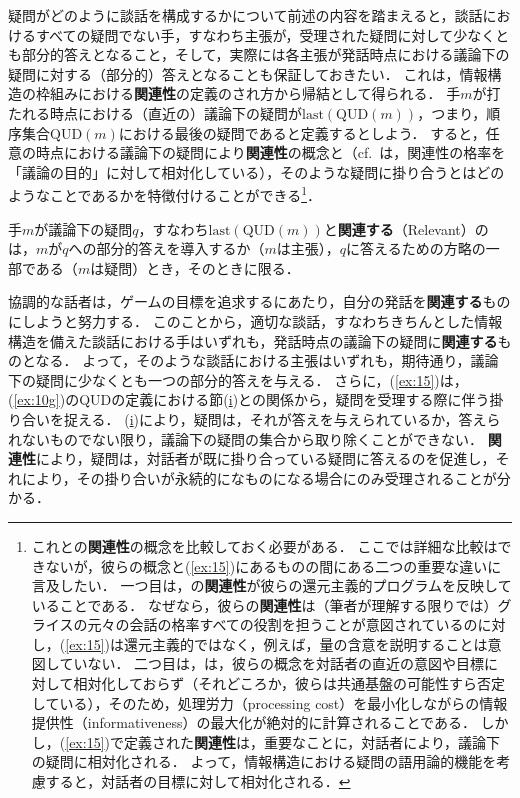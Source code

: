 \documentclass{goken}
\newcommand{\ori}[1]{\noindent\textcolor[gray]{0.7}{\fontsize{8pt}{8pt}\selectfont{\textsf{(p.~#1)}}} }
\begin{document}
疑問がどのように談話を構成するかについて前述の内容を踏まえると，談話におけるすべての疑問でない手，すなわち主張が，受理された疑問に対して少なくとも部分的答えとなること，そして，実際には各主張が発話時点における議論下の疑問に対する（部分的）答えとなることも保証しておきたい．
これは，情報構造の枠組みにおける\textbf{関連性}の定義のされ方から帰結として得られる．
手$m$が打たれる時点における（直近の）\textsf{議論下の疑問}が$\text{last}(\text{QUD}(m))$，つまり，順序集合$\text{QUD}(m)$における最後の疑問であると定義するとしよう．
\ori{21}
すると，任意の時点における議論下の疑問により\textbf{関連性}の概念と（cf.~\citeauthor{Grice1989}は，関連性の格率を「議論の目的」に対して相対化している），そのような疑問に掛り合うとはどのようなことであるかを特徴付けることができる\footnote{%
	これと\citet{SperberWilson1986}の\textbf{関連性}の概念を比較しておく必要がある．
	ここでは詳細な比較はできないが，彼らの概念と(\ref{ex:15})にあるものの間にある二つの重要な違いに言及したい．
	一つ目は，\citeauthor{SperberWilson1986}の\textbf{関連性}が彼らの還元主義的プログラムを反映していることである．
	なぜなら，彼らの\textbf{関連性}は（筆者が理解する限りでは）グライスの元々の会話の格率すべての役割を担うことが意図されているのに対し，(\ref{ex:15})は還元主義的ではなく，例えば，量の含意を説明することは意図していない．
	二つ目は，\citeauthor{SperberWilson1986}は，彼らの概念を対話者の直近の意図や目標に対して相対化しておらず（それどころか，彼らは共通基盤の可能性すら否定している），そのため，処理労力（processing cost）を最小化しながらの情報提供性（informativeness）の最大化が絶対的に計算されることである．
	しかし，(\ref{ex:15})で定義された\textbf{関連性}は，重要なことに，対話者により，議論下の疑問に相対化される．
	よって，情報構造における疑問の語用論的機能を考慮すると，対話者の目標に対して相対化される．
}．

\begin{exe}
	\ex\label{ex:15} 手$m$が議論下の疑問$q$，すなわち$\text{last}(\text{QUD}(m))$と\textbf{関連する}（Relevant）のは，$m$が$q$への部分的答えを導入するか（$m$は主張），$q$に答えるための方略の一部である（$m$は疑問）とき，そのときに限る．
\end{exe}

\noindent
協調的な話者は，ゲームの目標を追求するにあたり，自分の発話を\textbf{関連する}ものにしようと努力する．
このことから，適切な談話，すなわちきちんとした情報構造を備えた談話における手はいずれも，発話時点の議論下の疑問に\textbf{関連する}ものとなる．
よって，そのような談話における主張はいずれも，期待通り，議論下の疑問に少なくとも一つの部分的答えを与える．
さらに，(\ref{ex:15})は，(\ref{ex:10g})のQUDの定義における節(\hyperref[ex:10gi]{i})との関係から，疑問を受理する際に伴う掛り合いを捉える．
(\hyperref[ex:10gi]{i})により，疑問は，それが答えを与えられているか，答えられないものでない限り，議論下の疑問の集合から取り除くことができない．
\textbf{関連性}により，疑問は，対話者が既に掛り合っている疑問に答えるのを促進し，それにより，その掛り合いが永続的になものになる場合にのみ受理されることが分かる．
\end{document}
